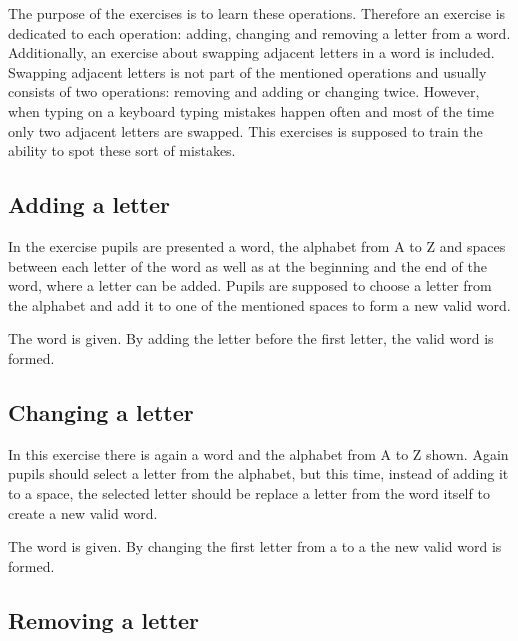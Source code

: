 The purpose of the  exercises is to learn these operations. Therefore an exercise is dedicated to each operation: adding, changing and removing a letter from a word. Additionally, an exercise about swapping adjacent letters in a word is included. Swapping adjacent letters is not part of the mentioned operations and usually consists of two operations: removing and adding or changing twice. However, when typing on a keyboard typing mistakes happen often and most of the time only two adjacent letters are swapped. This exercises is supposed to train the ability to spot these sort of mistakes.

\subsection*{Adding a letter}
\label{subsection:addingLetter}

In the  exercise pupils are presented a word, the alphabet from A to Z and spaces between each letter of the word as well as at the beginning and the end of the word, where a letter can be added. Pupils are supposed to choose a letter from the alphabet and add it to one of the mentioned spaces to form a new valid word.

\begin{example}
    The word  is given. By adding the letter  before the first letter, the valid word  is formed.
\end{example}

\subsection*{Changing a letter}
\label{subsection:changingLetter}

In this exercise there is again a word and the alphabet from A to Z shown. Again pupils should select a letter from the alphabet, but this time, instead of adding it to a space, the selected letter should be replace a letter from the word itself to create a new valid word.

\begin{example}
    The word  is given. By changing the first letter from a  to a  the new valid word  is formed.
\end{example}

\subsection*{Removing a letter}
\label{subsection:removingLetters}

